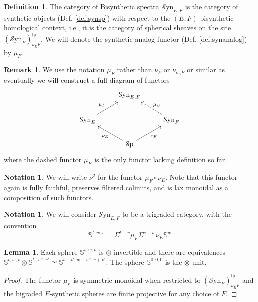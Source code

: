 \documentclass[10pt]{amsart}
\theoremstyle{definition}
\numberwithin{figure}{section}
\numberwithin{equation}{section}
\newtheorem{lemma}[figure]{Lemma}
\newtheorem{definition}[figure]{Definition}
\newtheorem{notation}[figure]{Notation}
\newtheorem{remark}[figure]{Remark}
\theoremstyle{cited}
\newcommand{\bS}{\mathbb{S}}
\newcommand{\Sp}{{\mathcal{S}\mathrm{p}}}
\newcommand{\fp}{\mathrm{fp}}
\newcommand{\Syn}{\mathcal{S}\mathrm{yn}}
\begin{document}
\begin{definition}
  The category of Bisynthetic spectra $\Syn_{E,F}$ is the category of synthetic objects (Def. \ref{def:synsp}) with respect to the $(E,F)$-bisynthetic homological context, i.e., it is the category of spherical sheaves on the site $(\Syn_E)_{\nu_E F}^\fp$. We will denote the synthetic analog functor (Def. \ref{def:synanalog}) by $\mu_F$.
\end{definition}

\begin{remark}
  We use the notation $\mu_F$ rather than $\nu_F$ or $\nu_{\nu_E F}$ or similar as eventually we will construct a full diagram of functors
\[\begin{tikzcd}
	& {\Syn_{E,F}} \\
	{\Syn_E} && {\Syn_F} \\
	& \Sp
	\arrow["{\mu_F}", from=2-1, to=1-2]
	\arrow["{\mu_E}"', dashed, from=2-3, to=1-2]
	\arrow["{\nu_E}", from=3-2, to=2-1]
	\arrow["{\nu_F}"', from=3-2, to=2-3]
\end{tikzcd}\]
where the dashed functor $\mu_E$ is the only functor lacking definition so far.
\end{remark}

\begin{notation}
  We will write $\nu^2$ for the functor $\mu_F\circ \nu_E$. Note that this functor again is fully faithful, preserves filtered colimits, and is lax monoidal as a composition of such functors.
\end{notation}

\begin{notation}
  We will consider $\Syn_{E,F}$ to be a trigraded category, with the convention
  \[
  \bS^{t,w,v}=\Sigma^{t-v}\mu_F\Sigma^{v-w}\nu_E\bS^w
  \]
\end{notation}

\begin{lemma}
  Each sphere $\bS^{t,w,v}$ is $\otimes$-invertible and there are equivalences $\bS^{t,w,v}\otimes \bS^{t',w',v'}\simeq \bS^{t+t',w+w',v+v'}$. The sphere $\bS^{0,0,0}$ is the $\otimes$-unit.
\end{lemma}

\begin{proof}
  The functor $\mu_F$ is symmetric monoidal when restricted to $(\Syn_{E})^\fp_{\nu_E F}$ and the bigraded $E$-synthetic spheres are finite projective for any choice of $F$.
\end{proof}
\end{document}
